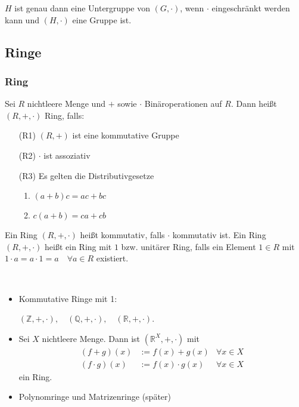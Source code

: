 \begin{bem}
	$ H $ ist genau dann eine Untergruppe von $ (G, \cdot) $, wenn $ \cdot $ eingeschränkt werden kann und $ (H, \cdot) $ eine Gruppe ist.
\end{bem}


\subsection{Ringe}

\subsubsection{Ring}
Sei $ R $ nichtleere Menge und $ + $ sowie $ \cdot $ Binäroperationen auf $ R $. Dann heißt $ (R,+,\cdot) $ Ring, falls:
\begin{itemize}
	\item[(R1)] $ (R,+) $ ist eine kommutative Gruppe
	\item[(R2)] $ \cdot $ ist assoziativ
	\item[(R3)] Es gelten die Distributivgesetze
	\begin{enumerate}[label={(\alph*)}]
		\item $ (a+b)c = ac+bc $
		\item $ c(a+b) = ca+cb $
	\end{enumerate}
\end{itemize}
Ein Ring $ (R, +, \cdot) $ heißt kommutativ, falls $ \cdot $ kommutativ ist. Ein Ring $ (R,+, \cdot) $ heißt ein Ring mit $ 1 $ bzw. unitärer Ring, falls ein Element $ 1 \in R $ mit $ 1 \cdot a = a \cdot 1 = a \quad \forall a \in R $ existiert.

\begin{bsp}\
	\begin{itemize}
		\item
			Kommutative Ringe mit 1:
			
			$ (\mathbb{Z},+, \cdot), \quad (\mathbb{Q},+, \cdot), \quad (\mathbb{R},+, \cdot) $.
		\item
			Sei $ X $ nichtleere Menge. Dann ist $ (\mathbb{R}^{X},+,\cdot) $ mit 
			\begin{align*}
				(f+g)(x) &:= f(x) + g(x) & \forall x \in X \\
				(f \cdot g)(x) &:= f(x) \cdot g(x) & \forall x \in X
			\end{align*}
			ein Ring.
		\item
			Polynomringe und Matrizenringe (später)
	\end{itemize}
\end{bsp}

